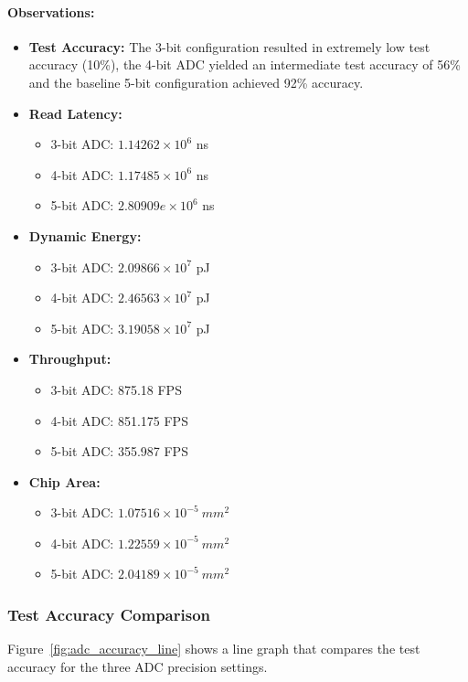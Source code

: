 \documentclass[11pt]{article}
\begin{document}
\paragraph{Observations:}
\begin{itemize}
    \item \textbf{Test Accuracy:} The 3-bit configuration resulted in extremely low test accuracy (10\%), the 4-bit ADC yielded an intermediate test accuracy of 56\% and the baseline 5-bit configuration achieved 92\% accuracy.
    \item \textbf{Read Latency:} \begin{itemize}
            \item 3-bit ADC: $1.14262\times10^6$ ns
            \item 4-bit ADC: $1.17485\times10^6$ ns
            \item 5-bit ADC: $2.80909e\times10^6$ ns
        \end{itemize}
    \item \textbf{Dynamic Energy:} \begin{itemize}
            \item 3-bit ADC: $2.09866\times10^7$ pJ
            \item 4-bit ADC: $2.46563\times10^7$ pJ
            \item 5-bit ADC: $3.19058\times10^7$ pJ
        \end{itemize}
    \item \textbf{Throughput:} \begin{itemize}
            \item 3-bit ADC: 875.18 FPS
            \item 4-bit ADC: 851.175 FPS
            \item 5-bit ADC: 355.987 FPS
        \end{itemize}
    \item \textbf{Chip Area:} \begin{itemize}
            \item 3-bit ADC: $1.07516\times 10^{-5} ~{mm}^2$
            \item 4-bit ADC: $1.22559\times 10^{-5} ~{mm}^2$
            \item 5-bit ADC: $2.04189\times 10^{-5} ~{mm}^2$
        \end{itemize}
\end{itemize}

\subsubsection{Test Accuracy Comparison}
Figure~\ref{fig:adc_accuracy_line} shows a line graph that compares the test accuracy for the three ADC precision settings.
\end{document}
